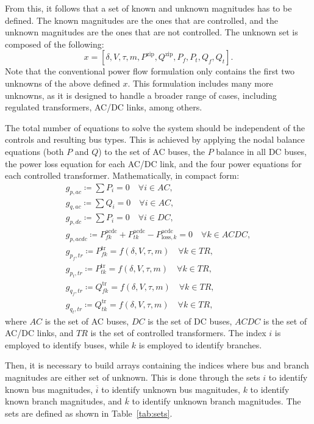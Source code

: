 \documentclass[11pt]{article}
\begin{document}
From this, it follows that a set of known and unknown magnitudes has to be defined. The known magnitudes are the ones that are controlled, and the unknown magnitudes are the ones that are not controlled. The unknown set is composed of the following:
\begin{equation}
	x = [\delta, V, \tau, m, P^\text{zip}, Q^\text{zip}, P_f, P_t, Q_f, Q_t].
\end{equation}
Note that the conventional power flow formulation only contains the first two unknowns of the above defined $x$. This formulation includes many more unknowns, as it is designed to handle a broader range of cases, including regulated transformers, AC/DC links, among others.

The total number of equations to solve the system should be independent of the controls and resulting bus types. This is achieved by applying the nodal balance equations (both $P$ and $Q$) to the set of AC buses, the $P$ balance in all DC buses, the power loss equation for each AC/DC link, and the four power equations for each controlled transformer. Mathematically, in compact form:
\begin{equation}
	\begin{aligned}
		g_{p,ac} \coloneqq \sum P_i = 0 \quad \forall i \in AC, \\
		g_{q,ac} \coloneqq \sum Q_i = 0 \quad \forall i \in AC, \\
		g_{p,dc} \coloneqq \sum P_i = 0 \quad \forall i \in DC, \\
		g_{p,acdc} \coloneqq P_{fk}^\text{acdc} + P_{tk}^\text{acdc} - P_{\text{loss},k}^\text{acdc} = 0 \quad \forall k \in ACDC, \\
		g_{p_f,tr} \coloneqq P_{fk}^\text{tr} = f(\delta, V, \tau, m) \quad \forall k \in TR, \\
		g_{p_t,tr} \coloneqq P_{tk}^\text{tr} = f(\delta, V, \tau, m) \quad \forall k \in TR, \\
		g_{q_f,tr} \coloneqq Q_{fk}^\text{tr} = f(\delta, V, \tau, m) \quad \forall k \in TR, \\
		g_{q_t,tr} \coloneqq Q_{tk}^\text{tr} = f(\delta, V, \tau, m) \quad \forall k \in TR,
	\end{aligned}
\end{equation}
where $AC$ is the set of AC buses, $DC$ is the set of DC buses, $ACDC$ is the set of AC/DC links, and $TR$ is the set of controlled transformers. The index $i$ is employed to identify buses, while $k$ is employed to identify branches. 

Then, it is necessary to build arrays containing the indices where bus and branch magnitudes are either set of unknown. This is done through the sets $i$ to identify known bus magnitudes, $\overline{i}$ to identify unknown bus magnitudes, $k$ to identify known branch magnitudes, and $\overline{k}$ to identify unknown branch magnitudes. The sets are defined as shown in Table~\ref{tab:sets}. 
\end{document}
